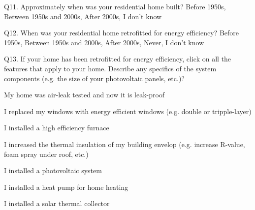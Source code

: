 \documentclass[12pt]{article}
\begin{document}
\begin{Form}
Q11. Approximately when was your residential home built?
\ChoiceMenu[combo, name=Q11_1, width=3cm, charsize=10pt, default=After 2000s]{}
{Before 1950s, Between 1950s and 2000s, After 2000s, I don't know}
\end{Form}

\begin{Form}
Q12. When was your residential home retrofitted for energy efficiency?
\ChoiceMenu[combo, name=Q12_1, width=3cm, charsize=10pt, default=After 2000s]{}
{Before 1950s, Between 1950s and 2000s, After 2000s, Never, I don't know}
\end{Form}

\begin{Form}
Q13. If your home has been retrofitted for energy efficiency, click on all the features that apply to your home. Describe any specifics of the system components (e.g. the size of your photovoltaic panels, etc.)?

 My home was air-leak tested and now it is leak-proof \\
	
 I replaced my windows with energy efficient windows (e.g. double or tripple-layer)\\
	
 I installed a high efficiency furnace \\ 
	
 I increased the thermal insulation of my building envelop (e.g. increase R-value, foam spray under roof, etc.) \\

 I installed a photovoltaic system \\
	
 I installed a heat pump for home heating \\
	
 I installed a solar thermal collector \\
	

\end{Form}
\end{document}
